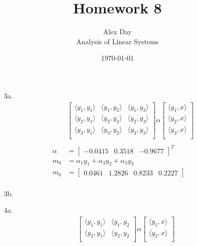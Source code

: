 \documentclass[12pt,fleqn,leqno,letterpaper]{article}
\title{Homework 8}
\author{Alex Day\\
	\small{Analysis of Linear Systems}
}
\date{\today}
\begin{document}
\maketitle
	\begin{enumerate}
		\item[3a.]
			\begin{align*}
			   &\begin{bmatrix}
				\langle y_{1}, y_{1} \rangle & \langle y_{1}, y_{2} \rangle & \langle y_{1}, y_{3} \rangle \\
				\langle y_{2}, y_{1} \rangle & \langle y_{2}, y_{2} \rangle & \langle y_{2}, y_{3} \rangle \\
				\langle y_{3}, y_{1} \rangle & \langle y_{3}, y_{2} \rangle & \langle y_{3}, y_{3} \rangle \\
				\end{bmatrix}
				\alpha
				\begin{bmatrix}
				\langle y_{1}, x \rangle \\
				\langle y_{2}, x \rangle \\
				\langle y_{3}, x \rangle \\
				\end{bmatrix}\\\\
				\alpha &= \begin{bmatrix} -0.0415 & 0.3518 & -0.9677 \end{bmatrix}^{T}\\
				m_{0} &= \alpha_{1} y_{1} + \alpha_{2} y_{2} + \alpha_{3} y_{3}\\
				m_{0} &= \begin{bmatrix} 0.0461 & 1.2826 & 0.8233 & 0.2227 \end{bmatrix}\\
			\end{align*}
		\item[3b.]
		\item[4a.]
			\begin{align*}
			   &\begin{bmatrix}
				\langle y_{1}, y_{1} \rangle & \langle y_{1}, y_{2}\\
				\langle y_{2}, y_{1} \rangle & \langle y_{2}, y_{2} \\
				\end{bmatrix}
				\alpha
				\begin{bmatrix}
				\langle y_{1}, x \rangle \\
				\langle y_{2}, x \rangle \\
				\end{bmatrix}\\\\

\end{align*}
\end{enumerate}
\end{document}
